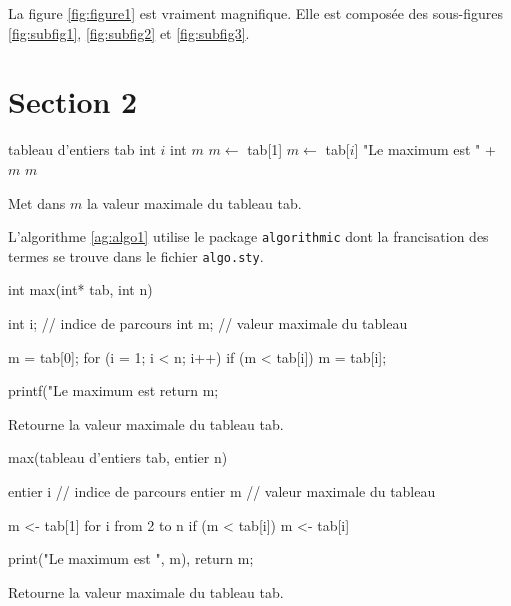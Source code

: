 La figure \ref{fig:figure1} est vraiment magnifique. Elle est composée des sous-figures \ref{fig:subfig1}, \ref{fig:subfig2} et \ref{fig:subfig3}.

\section{Section 2}

\begin{algorithm}
  \begin{algorithmic}
    \STATE tableau d'entiers tab 
    \STATE int $i$ 
    \STATE int $m$ 
    \STATE
    \STATE $m \leftarrow$ tab[1]
        \STATE $m \leftarrow$ tab[$i$]
      \ENDIF
      \STATE
      \STATE \PRINT "Le maximum est " + $m$
      \RETURN $m$
    \ENDFOR
  \end{algorithmic}
  \caption[Algorithme 1 (nom dans la liste des algorithmes)]{Met dans $m$ la valeur maximale du tableau tab.\label{ag:algo1}}
\end{algorithm}

L'algorithme \ref{ag:algo1} utilise le package \texttt{algorithmic} dont la francisation des termes se trouve dans le fichier \texttt{algo.sty}.

\begin{algorithm}
  \begin{C}
int max(int* tab, int n) {
  int i; // indice de parcours
  int m; // valeur maximale du tableau
  
  m = tab[0];
  for (i = 1; i < n; i++) {
    if (m < tab[i]) {
      m = tab[i];
    }
  }
  
  printf("Le maximum est %
  return m;
}
  \end{C}
  \caption[Algo en C]{Retourne la valeur maximale du tableau tab.\label{ag:algoc}}
\end{algorithm}

\begin{algorithm}
  \begin{PseudoCode}
max(tableau d'entiers tab, entier n) {
  entier i // indice de parcours
  entier m // valeur maximale du tableau
  
  m <- tab[1]
  for i from 2 to n {
    if (m < tab[i]) {
      m <- tab[i]
    }
  }
  
  print("Le maximum est ", m),
  return m;
}
  \end{PseudoCode}
  \caption[Algo en PseudoCode]{Retourne la valeur maximale du tableau tab.\label{ag:algop}}
\end{algorithm}

